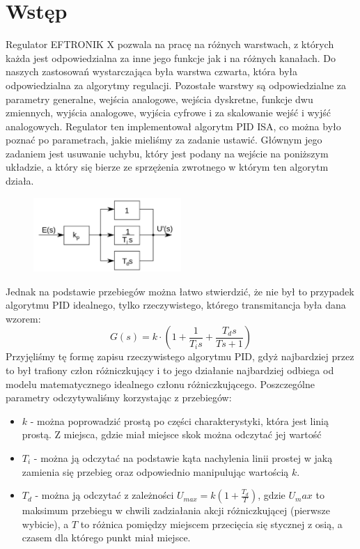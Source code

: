 \documentclass[a4paper, 12pt]{article}
\begin{document}
	\section{Wstęp}
		Regulator EFTRONIK X pozwala na pracę na różnych warstwach, z których każda jest odpowiedzialna za inne jego funkcje jak i na różnych kanałach. Do naszych zastosowań wystarczająca była warstwa czwarta, która była odpowiedzialna za algorytmy regulacji. Pozostałe warstwy są odpowiedzialne za parametry generalne, wejścia analogowe, wejścia dyskretne, funkcje dwu zmiennych, wyjścia analogowe, wyjścia cyfrowe i za skalowanie wejść i wyjść analogowych.
		\newline
		\newline
		Regulator ten implementował algorytm PID ISA, co można było poznać po parametrach, jakie mieliśmy za zadanie ustawić. Głównym jego zadaniem jest usuwanie uchybu, który jest podany na wejście na poniższym układzie, a który się bierze ze sprzężenia zwrotnego w którym ten algorytm działa.
		\begin{figure}[H]
			\centering
			\includegraphics[width=0.5\textwidth]{./grafika/PID.png}
		\end{figure}
		Jednak na podstawie przebiegów można łatwo stwierdzić, że nie był to przypadek algorytmu PID idealnego, tylko rzeczywistego, którego transmitancja była dana wzorem:
		$$
		G(s) = k \cdot \left( 
		1 + \frac{1}{T_is} + \frac{T_ds}{Ts+1}
		\right)
		$$
		Przyjęliśmy tę formę zapisu rzeczywistego algorytmu PID, gdyż najbardziej przez to był trafiony człon różniczkujący i to jego działanie najbardziej odbiega od modelu matematycznego idealnego członu różniczkującego. 
		\newline
		\newline
		Poszczególne parametry odczytywaliśmy korzystając z przebiegów:
		\begin{itemize}
			\item $k$ - można poprowadzić prostą po części charakterystyki, która jest linią prostą. Z miejsca, gdzie miał miejsce skok można odczytać jej wartość
			\item $T_i$ - można ją odczytać na podstawie kąta nachylenia linii prostej w jaką zamienia się przebieg oraz odpowiednio manipulując wartością $k$.
			\item $T_d$ - można ją odczytać z zależności $U_{max} = k \left(1 + \frac{T_d}{T}\right)$, gdzie $U_max$ to maksimum przebiegu w chwili zadziałania akcji różniczkującej (pierwsze wybicie), a $T$ to różnica pomiędzy miejscem przecięcia się stycznej z osią, a czasem dla którego punkt miał miejsce.
		\end{itemize}
\end{document}
